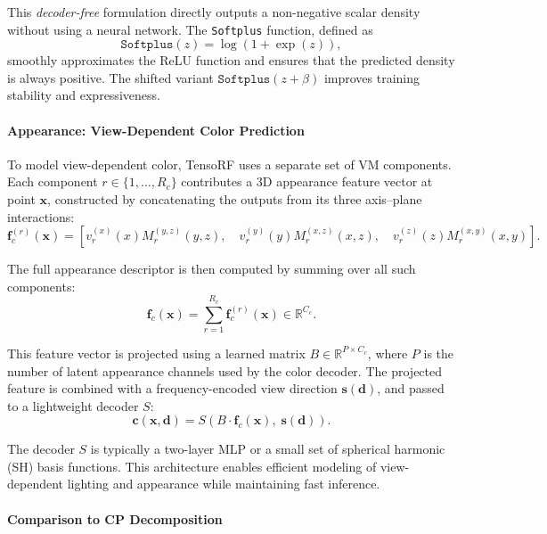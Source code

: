 \begin{enrichment}
\begin{enrichment}
    This \emph{decoder-free} formulation directly outputs a non-negative scalar density without using a neural network. The \texttt{Softplus} function, defined as
    \[
    \texttt{Softplus}(z) = \log(1 + \exp(z)),
    \]
    smoothly approximates the ReLU function and ensures that the predicted density is always positive. The shifted variant \( \texttt{Softplus}(z + \beta) \) improves training stability and expressiveness.
    
    \paragraph{Appearance: View-Dependent Color Prediction}
    
    To model view-dependent color, TensoRF uses a separate set of VM components. Each component \( r \in \{1, \ldots, R_c\} \) contributes a 3D appearance feature vector at point \( \mathbf{x} \), constructed by concatenating the outputs from its three axis–plane interactions:
    \[
    \mathbf{f}_c^{(r)}(\mathbf{x}) = \left[
    v^{(x)}_r(x) M^{(y,z)}_r(y,z), \quad
    v^{(y)}_r(y) M^{(x,z)}_r(x,z), \quad
    v^{(z)}_r(z) M^{(x,y)}_r(x,y)
    \right].
    \]
    
    The full appearance descriptor is then computed by summing over all such components:
    \[
    \mathbf{f}_c(\mathbf{x}) = \sum_{r=1}^{R_c} \mathbf{f}_c^{(r)}(\mathbf{x}) \in \mathbb{R}^{C_c}.
    \]
    
    This feature vector is projected using a learned matrix \( B \in \mathbb{R}^{P \times C_c} \), where \( P \) is the number of latent appearance channels used by the color decoder. The projected feature is combined with a frequency-encoded view direction \( \mathbf{s}(\mathbf{d}) \), and passed to a lightweight decoder \( S \):
    \[
    \mathbf{c}(\mathbf{x}, \mathbf{d}) = S\left( B \cdot \mathbf{f}_c(\mathbf{x}),\; \mathbf{s}(\mathbf{d}) \right).
    \]
    
    The decoder \( S \) is typically a two-layer MLP or a small set of spherical harmonic (SH) basis functions. This architecture enables efficient modeling of view-dependent lighting and appearance while maintaining fast inference.
    
    \paragraph{Comparison to CP Decomposition}
    

\end{enrichment}
\end{enrichment}
